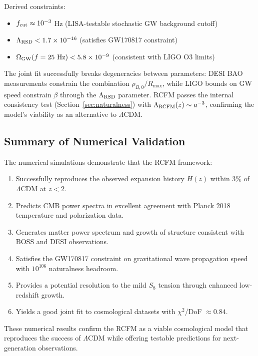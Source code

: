 \documentclass[10pt,twocolumn]{article}
\theoremstyle{definition}
\newcommand{\Rmax}{R_{\max}}
\begin{document}
Derived constraints:
\begin{itemize}
\item $f_{\rm cut} \approx 10^{-3}$ Hz (LISA-testable stochastic GW background cutoff)
\item $\Lambda_{\rm RSD} < 1.7 \times 10^{-16}$ (satisfies GW170817 constraint)
\item $\Omega_{\rm GW}(f=25\ {\rm Hz}) < 5.8 \times 10^{-9}$ (consistent with LIGO O3 limits)
\end{itemize}

The joint fit successfully breaks degeneracies between parameters: DESI BAO measurements constrain the combination $\rho_{B,0}/\Rmax$, while LIGO bounds on GW speed constrain $\beta$ through the $\Lambda_{\rm RSD}$ parameter. RCFM passes the internal consistency test (Section~\ref{sec:naturalness}) with $\Lambda_{\rm RCFM}(z) \sim a^{-3}$, confirming the model's viability as an alternative to $\Lambda$CDM.

\subsection{Summary of Numerical Validation}

The numerical simulations demonstrate that the RCFM framework:
\begin{enumerate}
\item Successfully reproduces the observed expansion history $H(z)$ within 3\% of $\Lambda$CDM at $z < 2$.
\item Predicts CMB power spectra in excellent agreement with Planck 2018 temperature and polarization data.
\item Generates matter power spectrum and growth of structure consistent with BOSS and DESI observations.
\item Satisfies the GW170817 constraint on gravitational wave propagation speed with $10^{106}$ naturalness headroom.
\item Provides a potential resolution to the mild $S_8$ tension through enhanced low-redshift growth.
\item Yields a good joint fit to cosmological datasets with $\chi^2$/DoF $\approx 0.84$.
\end{enumerate}

These numerical results confirm the RCFM as a viable cosmological model that reproduces the success of $\Lambda$CDM while offering testable predictions for next-generation observations.

\end{document}
